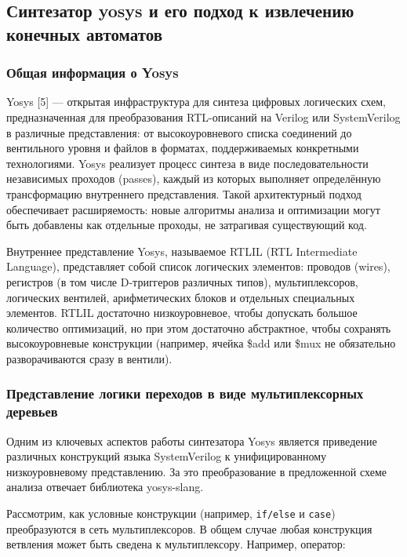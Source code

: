 \subsection{Синтезатор yosys и его подход к извлечению конечных автоматов}

\subsubsection{Общая информация о Yosys}

Yosys [5] --- открытая инфраструктура для синтеза цифровых логических схем, предназначенная для
преобразования RTL-описаний на Verilog или SystemVerilog в различные представления: от
высокоуровневого списка соединений до вентильного уровня и файлов в форматах, поддерживаемых
конкретными технологиями. Yosys реализует процесс синтеза в виде последовательности независимых
проходов (passes), каждый из которых выполняет определённую трансформацию внутреннего
представления. Такой архитектурный подход обеспечивает расширяемость: новые алгоритмы анализа
и оптимизации могут быть добавлены как отдельные проходы, не затрагивая существующий код.

Внутреннее представление Yosys, называемое RTLIL (RTL Intermediate Language), представляет собой
список логических элементов: проводов (wires), регистров (в том числе D-триггеров различных
типов), мультиплексоров, логических вентилей, арифметических блоков и отдельных специальных
элементов. RTLIL достаточно низкоуровневое, чтобы допускать большое количество оптимизаций,
но при этом достаточно абстрактное, чтобы сохранять высокоуровневые конструкции
(например, ячейка \$add или \$mux не обязательно разворачиваются сразу в вентили).

\subsubsection{Представление логики переходов в виде мультиплексорных деревьев}

Одним из ключевых аспектов работы синтезатора Yosys является приведение различных конструкций языка
SystemVerilog к унифицированному низкоуровневому представлению. За это преобразование в предложенной
схеме анализа отвечает библиотека yosys-slang.

Рассмотрим, как условные конструкции (например, \texttt{if/else} и \texttt{case}) преобразуются в сеть
мультиплексоров. В общем случае любая конструкция ветвления может быть сведена к мультиплексору.
Например, оператор:

